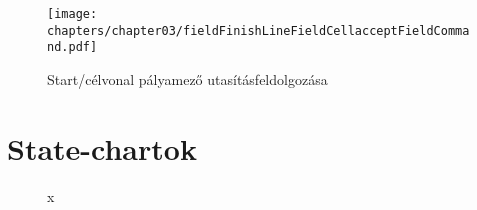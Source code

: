 \begin{figure}[h]
	\begin{center}
		\texttt{[image: chapters/chapter03/fieldFinishLineFieldCellacceptFieldCommand.pdf]}
		\caption{Start/célvonal pályamező utasításfeldolgozása}
		\label{fig:field.FinishLineFieldCell.accept}
	\end{center}
\end{figure}


\section{State-chartok}

\begin{figure}[h]
\begin{center}
\caption{x}
\label{fig:example3}
\end{center}
\end{figure}

